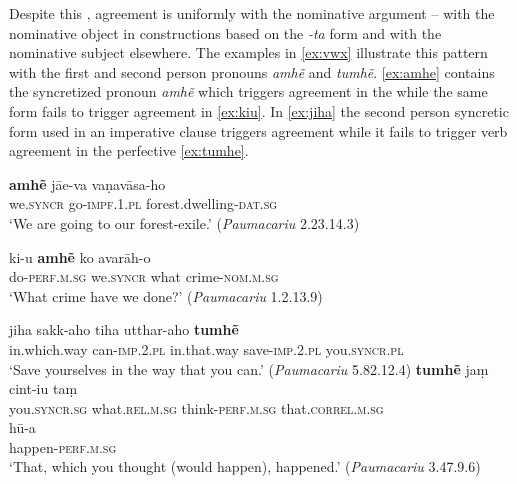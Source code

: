 \documentclass[output=paper,
modfonts
]{LSP/langsci}
\begin{document}
Despite this , agreement is uniformly with the nominative
argument -- with the nominative object in constructions based on the
\textit{-ta} form and with the nominative subject elsewhere. The examples
in \cref{ex:vwx} illustrate this pattern with the first and second person  pronouns
\textit{amhẽ} and  \textit{tumhẽ}.  \cref{ex:amhe}
contains the syncretized pronoun \textit{amhẽ} which triggers
agreement in the   while the same form fails to
trigger agreement in \cref{ex:kiu}. In \cref{ex:jiha} the second person 
syncretic form used in an imperative clause triggers agreement while it fails to trigger verb agreement in the perfective \cref{ex:tumhe}.


\begin{exe}
	\ex\label{ex:vwx}
\begin{xlist}
\ex\label{ex:amhe}\gll \textbf{amhẽ} jāe-va vaṇavāsa-ho \\
we.\textsc{syncr} go-\textsc{impf.1.pl} forest.dwelling-\textsc{dat.sg} \\
\glt `We are going to our forest-exile.' (\textit{Paumacariu} 2.23.14.3)

\ex\label{ex:kiu}\gll ki-u \textbf{amhẽ} ko avarāh-o \\
do-\textsc{perf.m.sg} we.\textsc{syncr} what crime-\textsc{nom.m.sg} \\
\glt `What crime have we done?' (\textit{Paumacariu} 1.2.13.9)

\ex\label{ex:jiha}\gll jiha sakk-aho tiha utthar-aho \textbf{tumhẽ}\\
in.which.way can-\textsc{imp.2.pl} in.that.way save-\textsc{imp.2.pl} you.\textsc{syncr.pl} \\
`Save yourselves in the way that you can.' (\textit{Paumacariu} 5.82.12.4)
\ex\label{ex:tumhe}\gll \textbf{tumhẽ} jaṃ cint-iu taṃ \\
you.\textsc{syncr.sg} what.\textsc{rel.m.sg} think-\textsc{perf.m.sg} that.\textsc{correl.m.sg} \\

\gll hū-a \\
happen-\textsc{perf.m.sg} \\
\glt `That, which  you thought (would happen),  happened.' (\textit{Paumacariu} 3.47.9.6)
\end{xlist}
\end{exe}
\end{document}
